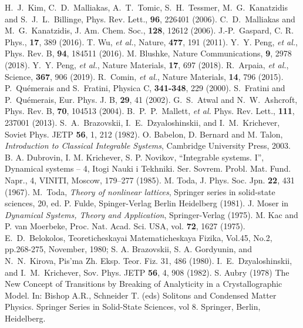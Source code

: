 \documentclass[]{revtex4-1}
\begin{document}
\begin{thebibliography}{99}
 H.~J.~Kim, C.~D.~Malliakas, A.~T.~Tomic, S.~H.~Tessmer, M.~G.~Kanatzidis and S.~J.~L.~Billinge, Phys. Rev. Lett., \textbf{96}, 226401 (2006).
 C.~D.~Malliakas and M.~G.~Kanatzidis, J. Am. Chem. Soc., \textbf{128}, 12612 (2006).
 J.-P.~Gaspard, C. R. Phys., \textbf{17}, 389 (2016). 
 T. Wu, \textit{et al.}, Nature, \textbf{477}, 191 (2011).
 Y.~Y. Peng, \textit{et al.}, Phys. Rev. B, \textbf{94}, 184511 (2016).
 M. Blushke, Nature Communications, \textbf{9}, 2978 (2018).
 Y.~Y. Peng, \textit{et al.}, Nature Materials, \textbf{17}, 697 (2018).
 R.~Arpaia, \textit{et al.}, Science, \textbf{367}, 906 (2019).
 R.~Comin, \textit{et al.}, Nature Materials, \textbf{14}, 796 (2015).
 P.~Qu\'emerais and S.~Fratini, Physica C, \textbf{341-348}, 229 (2000).
 S.~Fratini and P.~Qu\'emerais, Eur. Phys. J. B, \textbf{29}, 41 (2002).
 G.~S.~Atwal and N.~W.~Ashcroft, Phys. Rev. B, \textbf{70}, 104513 (2004).
 B.~P.~P.~Mallett, \textit{et al.} Phys. Rev. Lett., \textbf{111}, 237001 (2013).
 S.~A.~Brazovskii, I.~E.~Dzyaloshinskii, and I.~M.~Krichever, Soviet Phys. JETP \textbf{56}, 1, 212 (1982).
   O. Babelon, D. Bernard and M. Talon, \textit{Introduction to Classical Integrable Systems}, Cambridge University Press, 2003. 
 B. A. Dubrovin, I. M. Krichever, S. P. Novikov, “Integrable systems. I”, Dynamical systems – 4, Itogi Nauki i Tekhniki. Ser. Sovrem. Probl. Mat. Fund. Napr., 4, VINITI, Moscow, 179–277 (1985). 
   M. Toda, J. Phys. Soc. Jpn. \textbf{22}, 431 (1967).
 M.~Toda, \textit{Theory of nonlinear lattices}, Springer series in solid-state sciences, 20, ed. P. Fulde, Spinger-Verlag Berlin Heidelberg (1981).
 J. Moser in \textit{Dynamical Systems, Theory and Application}, Springer-Verlag (1975).
  M. Kac and P. van Moerbeke, Proc. Nat. Acad. Sci. USA, vol. \textbf{72}, 1627 (1975).
 E.~D.~Belokolos, Teoreticheskayai Matematicheskaya Fizika, Vol.45, No.2, pp.268-275, November, 1980; S. A. Brazovskii, S. A. Gordyunin, and N.~N.~Kirova, Pis'ma Zh. Eksp. Teor. Fiz. 31, 486 (1980).   
 I.~E.~Dzyaloshinskii, and I.~M.~Krichever, Sov. Phys. JETP \textbf{56}, 4, 908 (1982).
 S. Aubry (1978) The New Concept of Transitions by Breaking of Analyticity in a Crystallographic Model. In: Bishop A.R., Schneider T. (eds) Solitons and Condensed Matter Physics. Springer Series in Solid-State Sciences, vol 8. Springer, Berlin, Heidelberg. %

\end{thebibliography}
\end{document}
